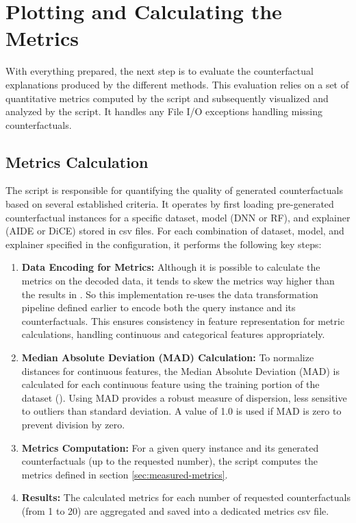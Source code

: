 \section{Plotting and Calculating the Metrics}
With everything prepared, the next step is to evaluate the counterfactual explanations produced by the different methods. This evaluation relies on a set of quantitative metrics computed by the  script and subsequently visualized and analyzed by the  script. It handles any File I/O exceptions handling missing counterfactuals.

\subsection{Metrics Calculation}
The  script is responsible for quantifying the quality of generated counterfactuals based on several established criteria. It operates by first loading pre-generated counterfactual instances for a specific dataset, model (DNN or RF), and explainer (AIDE or DiCE) stored in csv files. For each combination of dataset, model, and explainer specified
in the configuration, it performs the following key steps:

\begin{enumerate}
    \item \textbf{Data Encoding for Metrics:} Although it is possible to calculate the metrics on the decoded data, it tends to skew the metrics way higher than the results in \citet{guidotti2024counterfactual}. So this implementation re-uses the data transformation pipeline defined earlier  to encode both the query instance and its counterfactuals. This ensures consistency in feature representation for metric calculations, handling continuous and categorical features appropriately.
    \item \textbf{Median Absolute Deviation (MAD) Calculation:} To normalize distances for continuous features, the Median Absolute Deviation (MAD) is calculated for each continuous feature using the training portion of the dataset (). Using MAD provides a robust measure of dispersion, less sensitive to outliers than standard deviation. A value of 1.0 is used if MAD is zero to prevent division by zero.
    \item \textbf{Metrics Computation:} For a given query instance and its generated counterfactuals (up to the requested number), the script computes the metrics defined in section \ref{sec:measured-metrics}.
    \item \textbf{Results:} The calculated metrics for each number of requested counterfactuals (from 1 to 20) are aggregated and saved into a dedicated metrics csv file.
\end{enumerate}


